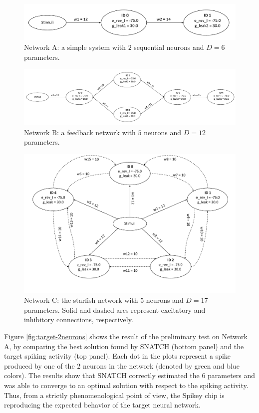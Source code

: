 \documentclass[utf8]{frontiersFPHY} %
\newcommand {\name}{SNATCH}
\begin{document}
\begin{figure}[!ht]
	\centering
	\includegraphics[width=.6\textwidth]{images/topologies/2_neurons_topology.pdf}
	\caption{Network A: a simple system with $2$ sequential neurons and $D=6$ parameters.}
	\label{fig:topology-2neurons}
\end{figure}
\begin{figure}[tb]
	\centering
	\includegraphics[width=\textwidth]{images/topologies/ring_topology.pdf}
	\caption{Network B: a feedback network with $5$ neurons and $D=12$ parameters.}
	\label{fig:topology-feedback}
\end{figure}
\begin{figure}[tb]
	\centering
	\includegraphics[width=.7\textwidth]{images/topologies/starfish_topology.pdf}
	\caption{Network C: the starfish network with $5$ neurons and $D=17$ parameters. Solid and dashed arcs represent excitatory and inhibitory connections, respectively.}
	\label{fig:topology-starfish}
\end{figure}



Figure \ref{fig:target-2neurons} shows the result of the preliminary test on Network A, by comparing the best solution found by \name{} (bottom panel) and the target spiking activity (top panel).
Each dot in the plots represent a spike produced by one of the $2$ neurons in the network (denoted by green and blue colors).
The results show that \name{} correctly estimated  the $6$ parameters and was able to converge to an optimal solution with respect to the spiking activity.
Thus, from a strictly phenomenological point of view, the Spikey chip is reproducing the expected behavior of the target neural network.
\end{document}
